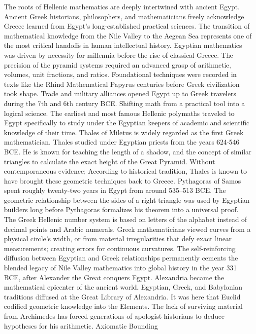 The roots of Hellenic mathematics are deeply intertwined with ancient Egypt. Ancient Greek historians, philosophers, and mathematicians freely acknowledge Greece learned from Egypt's long-established practical sciences. The transition of mathematical knowledge from the Nile Valley to the Aegean Sea represents one of the most critical handoffs in human intellectual history. Egyptian mathematics was driven by necessity for millennia before the rise of classical Greece. The precision of the pyramid systems required an advanced grasp of arithmetic, volumes, unit fractions, and ratios. Foundational techniques were recorded in texts like the Rhind Mathematical Papyrus centuries before Greek civilization took shape. Trade and military alliances opened Egypt up to Greek travelers during the 7th and 6th century BCE. Shifting math from a practical tool into a logical science.
The earliest and most famous Hellenic polymaths traveled to Egypt specifically to study under the Egyptian keepers of academic and scientific knowledge of their time. Thales of Miletus is widely regarded as the first Greek mathematician. Thales studied under Egyptian priests from the years 624-546 BCE. He is known for teaching the length of a shadow, and the concept of similar triangles to calculate the exact height of the Great Pyramid. Without contemporaneous evidence; According to historical tradition, Thales is known to have brought these geometric techniques back to Greece. Pythagoras of Samos spent roughly twenty-two years in Egypt from around 535–513 BCE. The geometric relationship between the sides of a right triangle was used by Egyptian builders long before Pythagoras formalizes his theorem into a universal proof. The Greek Hellenic number system is based on letters of the alphabet instead of decimal points and Arabic numerals. 
Greek mathematicians viewed curves from a physical circle’s width, or from material irregularities that defy exact linear measurements; creating errors for continuous curvatures. The self-reinforcing diffusion between Egyptian and Greek relationships permanently cements the blended legacy of Nile Valley mathematics into global history in the year 331 BCE, after Alexander the Great conquers Egypt. Alexandria became the mathematical epicenter of the ancient world. Egyptian, Greek, and Babylonian traditions diffused at the Great Library of Alexandria. It was here that Euclid codified geometric knowledge into the Elements. The lack of surviving material from Archimedes has forced generations of apologist historians to deduce hypotheses for his arithmetic. 
Axiomatic Bounding
